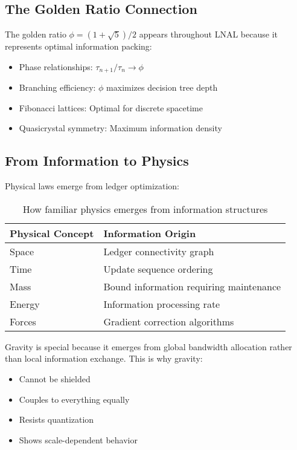 \documentclass[12pt,letterpaper]{article}
\begin{document}
\subsection{The Golden Ratio Connection}

The golden ratio $\phi = (1+\sqrt{5})/2$ appears throughout LNAL because it represents optimal information packing:

\begin{itemize}
    \item Phase relationships: $\tau_{n+1}/\tau_n \to \phi$
    \item Branching efficiency: $\phi$ maximizes decision tree depth
    \item Fibonacci lattices: Optimal for discrete spacetime
    \item Quasicrystal symmetry: Maximum information density
\end{itemize}

\subsection{From Information to Physics}

Physical laws emerge from ledger optimization:

\begin{table}[h]
\centering
\begin{tabular}{ll}
\toprule
\textbf{Physical Concept} & \textbf{Information Origin} \\
\midrule
Space & Ledger connectivity graph \\
Time & Update sequence ordering \\
Mass & Bound information requiring maintenance \\
Energy & Information processing rate \\
Forces & Gradient correction algorithms \\
\bottomrule
\end{tabular}
\caption{How familiar physics emerges from information structures}
\end{table}

\begin{tcolorbox}[keyresult]
Gravity is special because it emerges from global bandwidth allocation rather than local information exchange. This is why gravity:
\begin{itemize}[noitemsep]
    \item Cannot be shielded
    \item Couples to everything equally
    \item Resists quantization
    \item Shows scale-dependent behavior
\end{itemize}
\end{tcolorbox}
\end{document}
